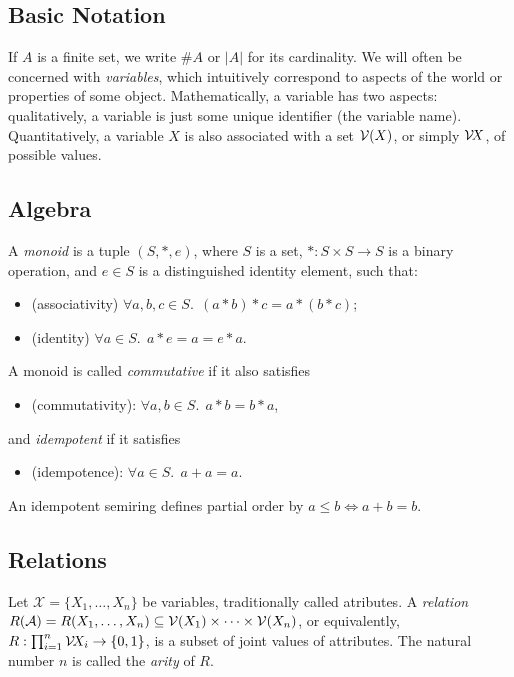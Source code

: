 
\subsection{Basic Notation}
If $A$ is a finite set, we write $\#A$ or $|A|$ for its cardinality.
We will often be concerned with \emph{variables}, which intuitively correspond to aspects of the world or properties of some object. 
Mathematically, a variable has two aspects:
qualitatively, a variable is just some unique identifier (the variable name).
Quantitatively, a variable $X$ is also associated with a set $\mathcal V(X)$, or simply $\mathcal V\!X$, of possible values. 

\subsection{Algebra}
\begin{defn}[Monoid]%
    A \emph{monoid} is a tuple $(S, *, e)$, where $S$ is a set, $* : S \times S \to S$ is a binary operation, and $e \in S$ is a distinguished identity element, such that:
    \begin{itemize}[itemsep=0pt,parsep=0pt,topsep=0pt,]
        \item (associativity) $\forall a, b,c \in S.~~(a*b)*c = a*(b*c)$;
        \item (identity) $\forall a \in S.~~a * e = a = e * a$.
    \end{itemize}
    A monoid is called \emph{commutative} if it also satisfies
    \begin{itemize}[nosep]
        \item (commutativity): $\forall a, b \in S.~~ a * b = b * a$,
    \end{itemize}
    and \emph{idempotent} if it satisfies
    \begin{itemize}[nosep]
        \item (idempotence): $\forall a \in S.~~ a + a = a$. 
    \end{itemize}
    An idempotent semiring defines partial order by $a \le b \iff a + b = b$. 
\end{defn}

\subsection{Relations}

Let $\mathcal X = \{ X_1, \ldots, X_n \}$ be variables, traditionally called atributes. 
A \emph{relation} $R(\mathcal A) = R(X_1, \ldots, X_n) \subseteq 
\mathcal V(X_1) \times \cdots \times \mathcal V(X_n)$, or equivalently, $R : \prod_{i=1}^n \mathcal V\!X_i \to \{0,1\}$, is a subset of joint values of attributes. 
The natural number $n$ is called the \emph{arity} of $R$. 


